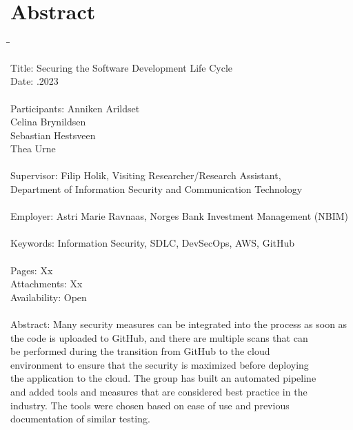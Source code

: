 
\chapter*{Abstract}

\begin{tabbing}
\hspace{2cm}\=\hspace{3cm}\=\kill %

Title: \> \> Securing the Software Development Life Cycle \\
Date: \> .2023 \\ 
\\
Participants: \> \> Anniken Arildset \\ \> \> Celina Brynildsen \\ \> \> Sebastian Hestsveen \\ \> \> Thea Urne \\
\\
Supervisor: \> \> Filip Holik, Visiting Researcher/Research Assistant, \\\> \> Department of Information Security and Communication Technology \\
\\
Employer: \> \>  Astri Marie Ravnaas, Norges Bank Investment Management (NBIM) \\
\\
Keywords: \> \> Information Security, SDLC, DevSecOps, AWS, GitHub \\
\\
Pages: \> \> Xx \\
Attachments: \> \> Xx \\
Availability: \> \> Open \\
\\
Abstract: \> \> Many security measures can be integrated into the process as soon as\\ \> \> the  code is uploaded to GitHub, and there are multiple scans that can\\ \> \> be performed during the transition from GitHub to the cloud\\ \> \> environment to ensure that the security is maximized before deploying\\ \> \>  the application to the cloud. The group has built an automated pipeline \\ \> \>and added tools and measures that are considered best practice in the\\ \> \> industry. The tools were chosen based on ease of use and previous \\ \> \>documentation of similar testing. 



\end{tabbing}
